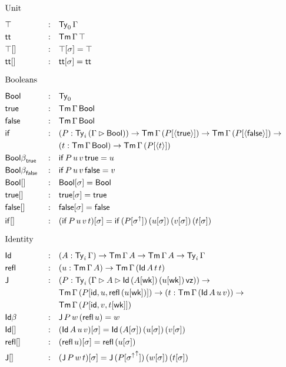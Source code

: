 \documentclass{article}
\begin{document}
\begin{alignat*}{5}
  & \heading{Unit} \\
  & \top && : && \Ty_0\,\Gamma \\
  & \tt && : && \Tm\,\Gamma\,\top \\
  & {\top[]} && : && \top[\sigma] = \top \\
  & {\tt[]} && : && \tt[\sigma] = \tt \\
  & \heading{Booleans} \\
  & \Bool && : && \Ty_0 \\
  & \true && : && \Tm\,\Gamma\,\Bool \\
  & \false && : && \Tm\,\Gamma\,\Bool \\
  & \IF && : && (P:\Ty_i\,(\Gamma\rhd\Bool))\ra\Tm\,\Gamma\,(P[\lb\true\rb])\ra\Tm\,\Gamma\,(P[\lb\false\rb])\ra \\
  & && && (t:\Tm\,\Gamma\,\Bool)\ra\Tm\,\Gamma\,(P[\lb t\rb]) \\
  & {\Bool\beta}_\true && : && \IF\,P\,u\,v\,\true = u \\
  & {\Bool\beta}_\false && : && \IF\,P\,u\,v\,\false = v \\
  & {\Bool[]} && : && \Bool[\sigma] = \Bool \\
  & {\true[]} && : && \true[\sigma] = \true \\
  & {\false[]} && : && \false[\sigma] = \false \\
  & {\IF[]} && : && (\IF\,P\,u\,v\,t)[\sigma] = \IF\,(P[\sigma^\uparrow])\,(u[\sigma])\,(v[\sigma])\,(t[\sigma]) \\
  & \heading{Identity} \\
  & \Id && : && (A:\Ty_i\,\Gamma)\ra\Tm\,\Gamma\,A\ra\Tm\,\Gamma\,A\ra\Ty_i\,\Gamma \\
  & \refl && : && (u : \Tm\,\Gamma\,A) \ra \Tm\,\Gamma\,(\Id\,A\,t\,t) \\
  & \J && : && (P : \Ty_i\,(\Gamma\rhd A\rhd \Id\,(A[\wk])\,(u[\wk])\,\vz))\ra \\
  & && && \Tm\,\Gamma\,(P[\id,u,\refl\,(u[\wk])])\ra(t:\Tm\,\Gamma\,(\Id\,A\,u\,v))\ra \\
  & && && \Tm\,\Gamma\,(P[\id,v,t[\wk]]) \\
  & {\Id\beta} && : && \J\,P\,w\,(\refl\,u) = w \\
  & {\Id[]} && : && (\Id\,A\,u\,v)[\sigma] = \Id\,(A[\sigma])\,(u[\sigma])\,(v[\sigma]) \\
  & {\refl[]} && : && (\refl\,u)[\sigma] = \refl\,(u[\sigma]) \\
  & {\J[]} && : && (\J\,P\,w\,t)[\sigma] = \J\,(P[{\sigma^\uparrow}^\uparrow])\,(w[\sigma])\,(t[\sigma]) \\
\end{alignat*}
\end{document}
